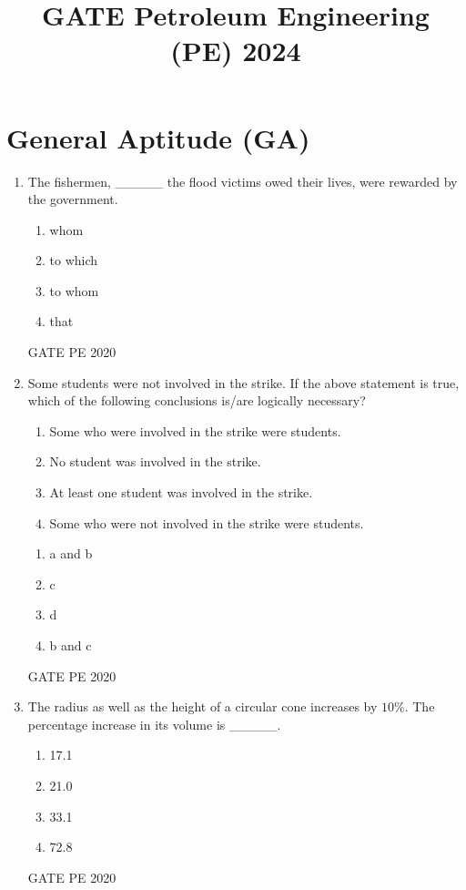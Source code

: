 \documentclass[journal,12pt,onecolumn]{IEEEtran}
\theoremstyle{remark}
\begin{document}
\title{GATE Petroleum Engineering (PE) 2024}
\maketitle
\section*{General Aptitude (GA)}
\begin{enumerate}
    \item The fishermen, \_\_\_\_\_ the flood victims owed their lives, were rewarded by the government.
   \begin{enumerate}
       \item whom 
       \item to which
       \item to whom
       \item  that
   \end{enumerate}
      \hfill{GATE PE 2020}
   
    \item Some students were not involved in the strike. If the above statement is true, which of the following conclusions is/are logically necessary?
    
    \begin{enumerate}
        \item Some who were involved in the strike were students.
        \item No student was involved in the strike.
        \item At least one student was involved in the strike.
        \item Some who were not involved in the strike were students.
    \end{enumerate}
     \begin{enumerate}
         \item a and b
         \item c
         \item d
         \item b and c
     \end{enumerate} 
      \hfill{GATE PE 2020}
    
    \item The radius as well as the height of a circular cone increases by $10\%$. The percentage increase in its volume is \_\_\_\_\_.
    \begin{enumerate}
        \item 17.1
        \item 21.0
        \item 33.1 
        \item  72.8
    \end{enumerate}
      \hfill{GATE PE 2020}
    

\end{enumerate}
\end{document}
